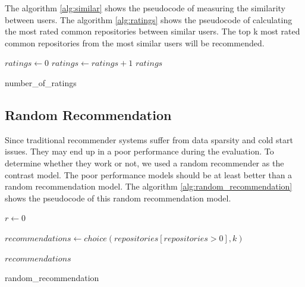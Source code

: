 \documentclass[11pt,twoside]{report}
\begin{document}
The algorithm \ref{alg:similar} shows the pseudocode of measuring the similarity between users. The algorithm \ref{alg:ratings} shows the pseudocode of calculating the most rated common repositories between similar users. The top k most rated common repositories from the most similar users will be recommended.

\begin{algorithm}[H]
    \DontPrintSemicolon
    

    $ratings \leftarrow 0$ \newline
    {
        {
            $ratings \leftarrow ratings + 1$
        }
    }
    \Return $ratings$
    
    \caption{number\_of\_ratings}
    \label{alg:ratings}
\end{algorithm}

\subsection{Random Recommendation}
Since traditional recommender systems suffer from data sparsity and cold start issues. They may end up in a poor performance during the evaluation. To determine whether they work or not, we used a random recommender as the contrast model. The poor performance models should be at least better than a random recommendation model. The algorithm \ref{alg:random_recommendation} shows the pseudocode of this random recommendation model.

\begin{algorithm}[H]
    \DontPrintSemicolon
    

    {
        {
            $r \leftarrow 0$
        }
    }

    $recommendations \leftarrow choice(repositories[repositories>0], k)$

    \Return $recommendations$
    
    \caption{random\_recommendation}
    \label{alg:random_recommendation}
\end{algorithm}
\end{document}
